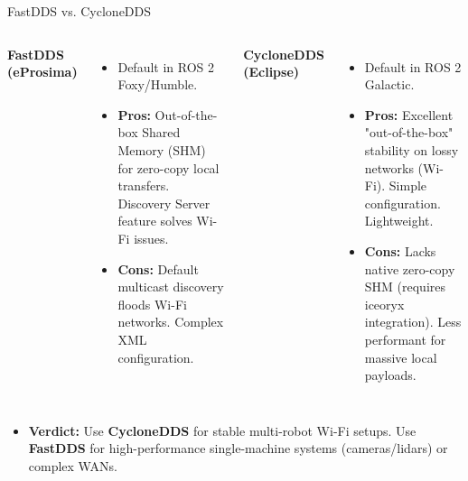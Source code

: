\documentclass[aspectratio=169]{beamer}
\begin{document}
\begin{frame}[t]{FastDDS vs. CycloneDDS}
    \begin{columns}
        \textbf{FastDDS (eProsima)}
        \begin{itemize}
            \item Default in ROS 2 Foxy/Humble.
            \item \textbf{Pros:} Out-of-the-box Shared Memory (SHM) for zero-copy local transfers. Discovery Server feature solves Wi-Fi issues.
            \item \textbf{Cons:} Default multicast discovery floods Wi-Fi networks. Complex XML configuration.
        \end{itemize}
        \textbf{CycloneDDS (Eclipse)}
        \begin{itemize}
            \item Default in ROS 2 Galactic.
            \item \textbf{Pros:} Excellent "out-of-the-box" stability on lossy networks (Wi-Fi). Simple configuration. Lightweight.
            \item \textbf{Cons:} Lacks native zero-copy SHM (requires iceoryx integration). Less performant for massive local payloads.
        \end{itemize}
    \end{columns}
    \vspace{0.1cm}
    \begin{itemize}
        \item \textbf{Verdict:} Use \textbf{CycloneDDS} for stable multi-robot Wi-Fi setups. Use \textbf{FastDDS} for high-performance single-machine systems (cameras/lidars) or complex WANs.
    \end{itemize}
\end{frame}
\end{document}

